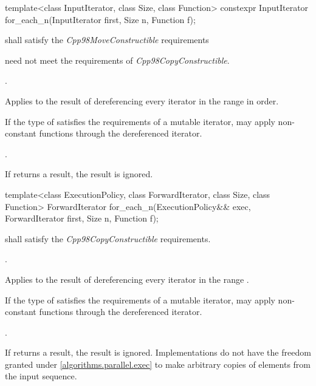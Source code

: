 %
\begin{itemdecl}
template<class InputIterator, class Size, class Function>
  constexpr InputIterator for_each_n(InputIterator first, Size n, Function f);
\end{itemdecl}

\begin{itemdescr}
\pnum
\requires
{} shall satisfy the \textit{Cpp98MoveConstructible} requirements
\begin{note}  need not meet the requirements of
\textit{Cpp98CopyConstructible}. \end{note}

\pnum
\requires
{}.

\pnum
\effects
Applies  to the result of dereferencing every iterator in the range
 in order.
\begin{note}
If the type of  satisfies the requirements of a mutable iterator,
 may apply non-constant functions through the dereferenced iterator.
\end{note}

\pnum
\returns
{}.

\pnum
\remarks
If  returns a result, the result is ignored.
\end{itemdescr}

%
\begin{itemdecl}
template<class ExecutionPolicy, class ForwardIterator, class Size, class Function>
  ForwardIterator for_each_n(ExecutionPolicy&& exec, ForwardIterator first, Size n,
                             Function f);
\end{itemdecl}

\begin{itemdescr}
\pnum
\requires
{} shall satisfy the \textit{Cpp98CopyConstructible} requirements.

\pnum
\requires
{}.

\pnum
\effects
Applies  to the result of dereferencing every iterator in the range
.
\begin{note}
If the type of  satisfies the requirements of a mutable iterator,
 may apply non-constant functions through the dereferenced iterator.
\end{note}

\pnum
\returns
{}.

\pnum
\remarks
If  returns a result, the result is ignored.  Implementations do not
have the freedom granted under \ref{algorithms.parallel.exec} to make arbitrary
copies of elements from the input sequence.
\end{itemdescr}


